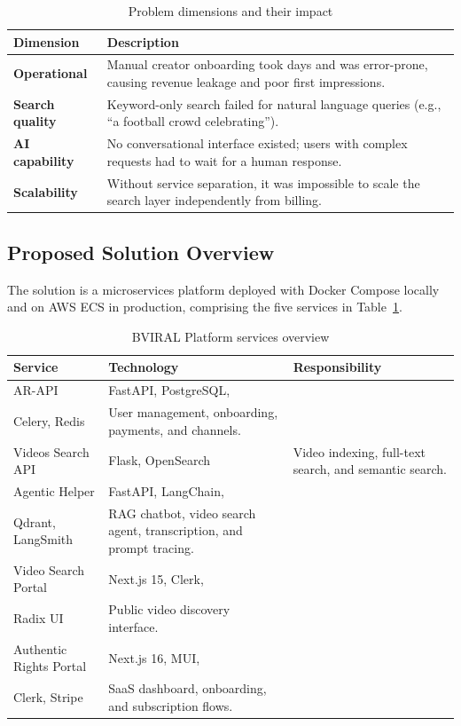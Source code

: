 \begin{table}[H]
\centering
\caption{Problem dimensions and their impact}
\begin{tabularx}{\textwidth}{>{\bfseries}lX}
\toprule
Dimension & Description \\
\midrule
Operational & Manual creator onboarding took days and was error-prone, causing revenue leakage
              and poor first impressions. \\[0.5em]
Search quality & Keyword-only search failed for natural language queries (e.g., ``a football
                 crowd celebrating''). \\[0.5em]
AI capability & No conversational interface existed; users with complex requests had to wait
                for a human response. \\[0.5em]
Scalability & Without service separation, it was impossible to scale the search layer
              independently from billing. \\
\bottomrule
\end{tabularx}
\end{table}

\subsection{Proposed Solution Overview}

The solution is a microservices platform deployed with Docker Compose locally and on AWS ECS in
production, comprising the five services in Table~\ref{tab:services}.

\begin{table}[H]
\centering
\caption{BVIRAL Platform services overview}
\label{tab:services}
\small
\renewcommand{\arraystretch}{1.15}
\begin{tabularx}{\textwidth}{>{\raggedright\arraybackslash}p{} >{\raggedright\arraybackslash}p{} >{\raggedright\arraybackslash}X}
\toprule
\textbf{Service} & \textbf{Technology} & \textbf{Responsibility} \\
\midrule
AR-API & FastAPI, PostgreSQL,\\ Celery, Redis & User management, onboarding, payments, and channels. \\
Videos Search API & Flask, OpenSearch & Video indexing, full-text search, and semantic search. \\
Agentic Helper & FastAPI, LangChain,\\ Qdrant, LangSmith & RAG chatbot, video search agent, transcription, and prompt tracing. \\
Video Search Portal & Next.js 15, Clerk,\\ Radix UI & Public video discovery interface. \\
Authentic Rights Portal & Next.js 16, MUI,\\ Clerk, Stripe & SaaS dashboard, onboarding, and subscription flows. \\
\bottomrule
\end{tabularx}
\normalsize
\end{table}

